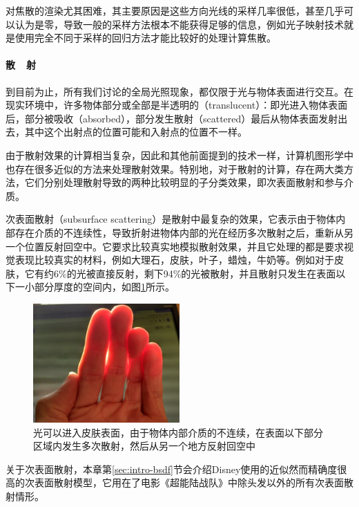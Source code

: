 对焦散的渲染尤其困难，其主要原因是这些方向光线的采样几率很低，甚至几乎可以认为是零，导致一般的采样方法根本不能获得足够的信息，例如光子映射技术就是使用完全不同于采样的回归方法才能比较好的处理计算焦散。



\paragraph{散~~射}
到目前为止，所有我们讨论的全局光照现象，都仅限于光与物体表面进行交互。在现实环境中，许多物体部分或全部是半透明的（translucent）：即光进入物体表面后，部分被吸收（absorbed），部分发生散射（scattered）最后从物体表面发射出去，其中这个出射点的位置可能和入射点的位置不一样。

由于散射效果的计算相当复杂，因此和其他前面提到的技术一样，计算机图形学中也存在很多近似的方法来处理散射效果。特别地，对于散射的计算，存在两大类方法，它们分别处理散射导致的两种比较明显的子分类效果，即次表面散射和参与介质。

次表面散射（subsurface scattering）是散射中最复杂的效果，它表示由于物体内部存在介质的不连续性，导致折射进物体内部的光在经历多次散射之后，重新从另一个位置反射回空中。它要求比较真实地模拟散射效果，并且它处理的都是要求视觉表现比较真实的材料，例如大理石，皮肤，叶子，蜡烛，牛奶等。例如对于皮肤，它有约6\%的光被直接反射，剩下94\%的光被散射，并且散射只发生在表面以下一小部分厚度的空间内，如图\ref{f:intro-sss}所示。

\begin{figure}
\sidecaption
\includegraphics[width=0.5\textwidth]{figures/intro/subsurface-scattering}	
\caption{光可以进入皮肤表面，由于物体内部介质的不连续，在表面以下部分区域内发生多次散射，然后从另一个地方反射回空中}
\label{f:intro-sss}
\end{figure}

关于次表面散射，本章第\ref{sec:intro-bsdf}节会介绍Disney使用的近似然而精确度很高的次表面散射模型，它用在了电影《超能陆战队》中除头发以外的所有次表面散射情形。

